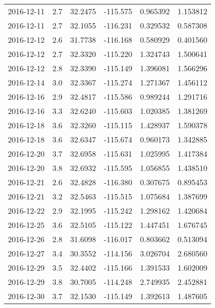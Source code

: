 \begin{tabular}{lrrrrr}
2016-12-11 &       2.7 &  32.2475 &  -115.575 &         0.965392 &         1.153812 \\
2016-12-11 &       2.7 &  32.1055 &  -116.231 &         0.329532 &         0.587308 \\
2016-12-12 &       2.6 &  31.7738 &  -116.168 &         0.580929 &         0.401560 \\
2016-12-12 &       2.7 &  32.3320 &  -115.220 &         1.324743 &         1.500641 \\
2016-12-12 &       2.8 &  32.3390 &  -115.149 &         1.396081 &         1.566296 \\
2016-12-14 &       3.0 &  32.3367 &  -115.274 &         1.271367 &         1.456112 \\
2016-12-16 &       2.9 &  32.4817 &  -115.586 &         0.989244 &         1.291716 \\
2016-12-16 &       3.3 &  32.6240 &  -115.603 &         1.020385 &         1.381269 \\
2016-12-18 &       3.6 &  32.3260 &  -115.115 &         1.428937 &         1.590378 \\
2016-12-18 &       3.6 &  32.6347 &  -115.674 &         0.960173 &         1.342885 \\
2016-12-20 &       3.7 &  32.6958 &  -115.631 &         1.025995 &         1.417384 \\
2016-12-20 &       3.8 &  32.6932 &  -115.595 &         1.056855 &         1.438510 \\
2016-12-21 &       2.6 &  32.4828 &  -116.380 &         0.307675 &         0.895453 \\
2016-12-21 &       3.2 &  32.5463 &  -115.515 &         1.075684 &         1.387699 \\
2016-12-22 &       2.9 &  32.1995 &  -115.242 &         1.298162 &         1.420684 \\
2016-12-25 &       3.6 &  32.5105 &  -115.122 &         1.447451 &         1.676745 \\
2016-12-26 &       2.8 &  31.6098 &  -116.017 &         0.803662 &         0.513094 \\
2016-12-27 &       3.4 &  30.3552 &  -114.156 &         3.026704 &         2.680560 \\
2016-12-29 &       3.5 &  32.4402 &  -115.166 &         1.391533 &         1.602009 \\
2016-12-29 &       3.8 &  30.7005 &  -114.248 &         2.749935 &         2.452881 \\
2016-12-30 &       3.7 &  32.1530 &  -115.149 &         1.392613 &         1.487605 \\

\end{tabular}
